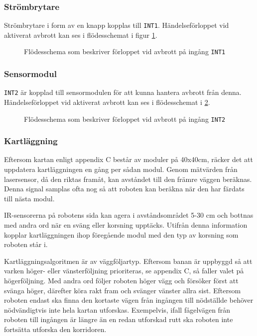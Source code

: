 \documentclass[11pt]{article}
\begin{document}
\begin{flushleft}
\subsubsection {Strömbrytare}
Strömbrytare i form av en knapp kopplas till \verb+INT1+. Händelseförloppet vid aktiverat avbrott kan ses i flödesschemat i figur \ref{avbrott_strombrytare}. 

\begin{figure}[htbp]
\centering
\noindent\resizebox{.6\linewidth}{!}{
	}
	\cprotect\caption{Flödesschema som beskriver förloppet vid avbrott på ingång \verb+INT1+ \label{avbrott_strombrytare}}	
\end{figure}

\subsubsection {Sensormodul} 
\verb+INT2+ är kopplad till sensormodulen för att kunna hantera avbrott från denna. Händelseförloppet vid aktiverat avbrott kan ses i flödesschemat i \ref{avbrott_sensormodul}.

\begin{figure}[htbp]
\centering
\noindent\resizebox{1\linewidth}{!}{
	}
	\cprotect\caption{Flödesschema som beskriver förloppet vid avbrott på ingång \verb+INT2+ \label{avbrott_sensormodul}}	
\end{figure}

\subsubsection{Kartläggning}
Eftersom kartan enligt appendix 	C består av moduler på 40x40cm, räcker det att uppdatera kartläggningen en gång per sådan modul. Genom mätvärden från lasersensor, då den riktas framåt, kan avståndet till den främre väggen beräknas. Denna signal samplas ofta nog så att roboten kan beräkna när den har färdats till nästa modul. 

IR-sensorerna på robotens sida kan agera i avståndsområdet 5-30 cm och bottnas med andra ord när en sväng eller korsning upptäcks. Utifrån denna information kopplar kartläggningen ihop föregående modul med den typ av korsning som roboten står i. 

Kartläggningsalgoritmen är av väggföljartyp. Eftersom banan är uppbyggd så att varken höger- eller vänsterföljning prioriteras, se appendix C, så faller valet på högerföljning. Med andra ord följer roboten höger vägg och försöker först att svänga höger, därefter köra rakt fram och svänger vänster allra sist. Eftersom roboten endast ska finna den kortaste vägen från ingången till nödställde behöver nödvändigtvis inte hela kartan utforskas. Exempelvis, ifall fågelvägen från roboten till ingången är längre än en redan utforskad rutt ska roboten inte fortsätta utforska den korridoren.


\end{flushleft}
\end{document}
